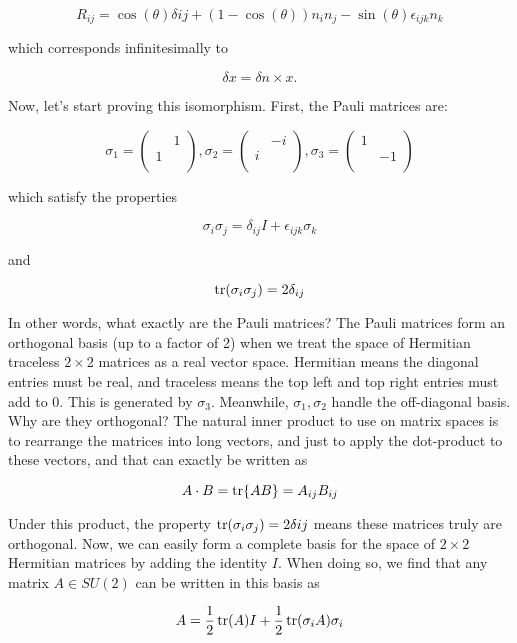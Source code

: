 \documentclass{article}
\theoremstyle{definition}
\begin{document}
$$ R_{ij} = \cos(\theta) \delta{ij} + (1 - \cos(\theta)) n_i n_j - \sin(\theta)
\epsilon_{ijk} n_k $$

which corresponds infinitesimally to

$$ \delta x = \delta n \times x. $$

Now, let's start proving this isomorphism. First, the Pauli matrices are:

$$
\sigma_1 =
\begin{pmatrix}
  & 1 \\
  1 & \\
\end{pmatrix},
\sigma_2 =
\begin{pmatrix}
  & -i \\
  i & \\
\end{pmatrix},
\sigma_3 =
\begin{pmatrix}
  1 & \\
  & -1 \\
\end{pmatrix}
$$

which satisfy the properties

$$ \sigma_i \sigma_j = \delta_{ij}I + \epsilon_{ijk} \sigma_k $$

and

$$ \tr(\sigma_i \sigma_j) = 2 \delta_{ij} $$

In other words, what exactly are the Pauli matrices? The Pauli matrices form an
orthogonal basis (up to a factor of 2) when we treat the space of Hermitian traceless
$2\times 2$ matrices as a real vector space. Hermitian means the diagonal
entries must be real, and traceless means the top left and top right entries
must add to 0. This is generated by $\sigma_3$. Meanwhile, $\sigma_1, \sigma_2$
handle the off-diagonal basis. Why are they orthogonal? The natural inner
product to use on matrix spaces is to rearrange the matrices into long vectors,
and just to apply the dot-product to these vectors, and that can exactly be
written as

$$ A \cdot B = \tr{AB} = A_{ij} B_{ij} $$

Under this product, the property $ \tr(\sigma_i \sigma_j) = 2 \delta{ij}$ means
these matrices truly are orthogonal. Now, we can easily form a complete basis
for the space of $2 \times 2$ Hermitian matrices by adding the identity $I$.
When doing so, we find that any matrix $A \in SU(2)$ can be written in this
basis as

$$ A = \frac{1}{2} \tr(A) I + \frac{1}{2} \tr(\sigma_i A) \sigma_i $$
\end{document}
